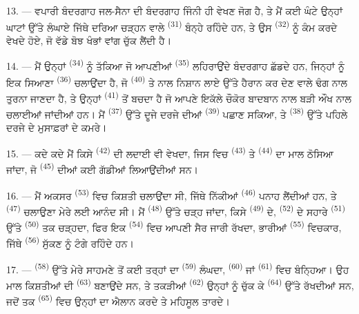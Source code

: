 13. --- ਵਪਾਰੀ ਬੰਦਰਗਾਹ ਜਲ-ਸੈਨਾ ਦੀ ਬੰਦਰਗਾਹ ਜਿੰਨੀ ਹੀ ਵੇਖਣ ਜੋਗ ਹੈ, ਤੇ ਮੈਂ ਕਈ ਘੰਟੇ
ਉਨ੍ਹਾਂ ਘਾਟਾਂ ਉੱਤੇ ਲੰਘਾਏ ਜਿੱਥੇ ਦਰਿਆ ਚੜ੍ਹਨ ਵਾਲੇ 
\textsuperscript{(31)} ਬੰਨ੍ਹੇ ਰਹਿੰਦੇ ਹਨ, ਤੇ ਉਸ 
\textsuperscript{(32)} ਨੂੰ ਕੰਮ ਕਰਦੇ ਵੇਖਦੇ ਹੋਏ, ਜੋ ਵੱਡੇ ਬੋਝ ਖੰਭਾਂ ਵਾਂਗ ਚੁੱਕ ਲੈਂਦੀ ਹੈ।

\VUsaut{4.0mm}
\VUsaut{3.0mm}

14. --- ਮੈਂ ਉਨ੍ਹਾਂ  \textsuperscript{(34)} ਨੂੰ ਤੱਕਿਆ
ਜੋ ਆਪਣੀਆਂ  \textsuperscript{(35)} ਲਹਿਰਾਉਂਦੇ ਬੰਦਰਗਾਹ ਛੱਡਦੇ ਹਨ,
ਜਿਨ੍ਹਾਂ ਨੂੰ ਇਕ ਸਿਆਣਾ  \textsuperscript{(36)} ਚਲਾਉਂਦਾ ਹੈ, ਜੋ
 \textsuperscript{(40)} ਤੇ  ਨਾਲ ਨਿਸ਼ਾਨ ਲਾਏ
 ਉੱਤੇ ਹੈਰਾਨ ਕਰ ਦੇਣ ਵਾਲੇ ਢੰਗ ਨਾਲ ਤੁਰਨਾ ਜਾਣਦਾ ਹੈ, ਤੇ ਉਨ੍ਹਾਂ
 \textsuperscript{(41)} ਤੋਂ ਬਚਦਾ ਹੈ ਜੋ ਆਪਣੇ ਇਕੱਲੇ ਚੌਕੋਰ ਬਾਦਬਾਨ
ਨਾਲ ਬੜੀ ਔਖ ਨਾਲ ਚਲਾਈਆਂ ਜਾਂਦੀਆਂ ਹਨ। ਮੈਂ  \textsuperscript{(37)}
ਉੱਤੇ ਦੂਜੇ ਦਰਜੇ ਦੀਆਂ  \textsuperscript{(39)} ਪਛਾਣ ਸਕਿਆ, ਤੇ
 \textsuperscript{(38)} ਉੱਤੇ ਪਹਿਲੇ ਦਰਜੇ ਦੇ ਮੁਸਾਫ਼ਰਾਂ ਦੇ ਕਮਰੇ।

15. --- ਕਦੇ ਕਦੇ ਮੈਂ ਕਿਸੇ  \textsuperscript{(42)} ਦੀ ਲਦਾਈ ਵੀ
ਵੇਖਦਾ, ਜਿਸ ਵਿਚ  \textsuperscript{(43)} ਤੇ
 \textsuperscript{(44)} ਦਾ ਮਾਲ ਠੋਸਿਆ ਜਾਂਦਾ, ਜੋ
 \textsuperscript{(45)} ਦੀਆਂ ਕਈ ਗੱਡੀਆਂ ਲਿਆਉਂਦੀਆਂ ਸਨ।

\VUsaut{3.0mm}
\VUsaut{3.0mm}

16. --- ਮੈਂ ਅਕਸਰ  \textsuperscript{(53)} ਵਿਚ ਕਿਸ਼ਤੀ ਚਲਾਉਂਦਾ ਸੀ,
ਜਿੱਥੇ ਨਿੱਕੀਆਂ  \textsuperscript{(46)} ਪਨਾਹ ਲੈਂਦੀਆਂ ਹਨ, ਤੇ
 \textsuperscript{(47)} ਚਲਾਉਣਾ ਮੇਰੇ ਲਈ ਆਨੰਦ ਸੀ। ਮੈਂ 
\textsuperscript{(48)} ਉੱਤੇ ਚੜ੍ਹ ਜਾਂਦਾ, ਕਿਸੇ 
\textsuperscript{(49)} ਦੇ,  \textsuperscript{(52)} ਦੇ ਸਹਾਰੇ
 \textsuperscript{(51)} ਉੱਤੇ 
\textsuperscript{(50)} ਤਕ ਚੜ੍ਹਦਾ, ਫਿਰ ਇਕ  \textsuperscript{(54)} ਵਿਚ
ਆਪਣੀ ਸੈਰ ਜਾਰੀ ਰੱਖਦਾ, ਭਾਰੀਆਂ  \textsuperscript{(55)}
ਵਿਚਕਾਰ, ਜਿੱਥੇ  \textsuperscript{(56)} ਸੁੱਕਣ ਨੂੰ ਟੰਗੇ ਰਹਿੰਦੇ ਹਨ।

17. ---  \textsuperscript{(58)} ਉੱਤੇ ਮੇਰੇ ਸਾਹਮਣੇ ਤੋਂ ਕਈ ਤਰ੍ਹਾਂ ਦਾ
 \textsuperscript{(59)} ਲੰਘਦਾ,  \textsuperscript{(60)}
ਜਾਂ  \textsuperscript{(61)} ਵਿਚ ਬੰਨ੍ਹਿਆ। ਉਹ ਮਾਲ ਕਿਸ਼ਤੀਆਂ ਦੀ
 \textsuperscript{(63)} ਬਣਾਉਂਦੇ ਸਨ, ਤੇ ਤਕੜੀਆਂ 
\textsuperscript{(62)} ਉਨ੍ਹਾਂ ਨੂੰ ਚੁੱਕ ਕੇ  \textsuperscript{(64)} ਉੱਤੇ
ਰੱਖਦੀਆਂ ਸਨ, ਜਦੋਂ ਤਕ   \textsuperscript{(65)} ਵਿਚ
ਉਨ੍ਹਾਂ ਦਾ ਐਲਾਨ ਕਰਦੇ ਤੇ ਮਹਿਸੂਲ ਤਾਰਦੇ।

